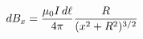\documentclass[preview]{standalone}
\begin{document}
\begin{align*}
dB_{x}  =  { \mu_0 I \, d\ell  \over  4\pi } {R  \over  (x^2 + R^2)^{3/2}}
\end{align*}
\end{document}
